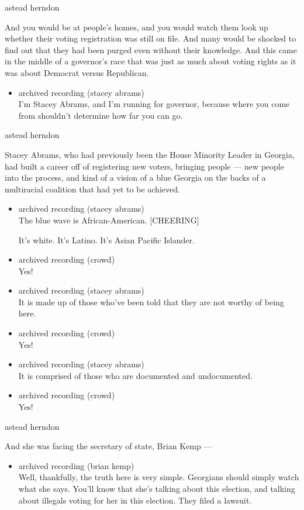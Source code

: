 astead herndon

And you would be at people's homes, and you would watch them look up
whether their voting registration was still on file. And many would be
shocked to find out that they had been purged even without their
knowledge. And this came in the middle of a governor's race that was
just as much about voting rights as it was about Democrat versus
Republican.

\begin{itemize}
\tightlist
\item
  archived recording (stacey abrams)\\
  I'm Stacey Abrams, and I'm running for governor, because where you
  come from shouldn't determine how far you can go.
\end{itemize}

astead herndon

Stacey Abrams, who had previously been the House Minority Leader in
Georgia, had built a career off of registering new voters, bringing
people --- new people into the process, and kind of a vision of a blue
Georgia on the backs of a multiracial coalition that had yet to be
achieved.

\begin{itemize}
\item
  archived recording (stacey abrams)\\
  The blue wave is African-American. {[}CHEERING{]}

  It's white. It's Latino. It's Asian Pacific Islander.
\item
  archived recording (crowd)\\
  Yes!
\item
  archived recording (stacey abrams)\\
  It is made up of those who've been told that they are not worthy of
  being here.
\item
  archived recording (crowd)\\
  Yes!
\item
  archived recording (stacey abrams)\\
  It is comprised of those who are documented and undocumented.
\item
  archived recording (crowd)\\
  Yes!
\end{itemize}

astead herndon

And she was facing the secretary of state, Brian Kemp ---

\begin{itemize}
\tightlist
\item
  archived recording (brian kemp)\\
  Well, thankfully, the truth here is very simple. Georgians should
  simply watch what she says. You'll know that she's talking about this
  election, and talking about illegals voting for her in this election.
  They filed a lawsuit.
\end{itemize}

